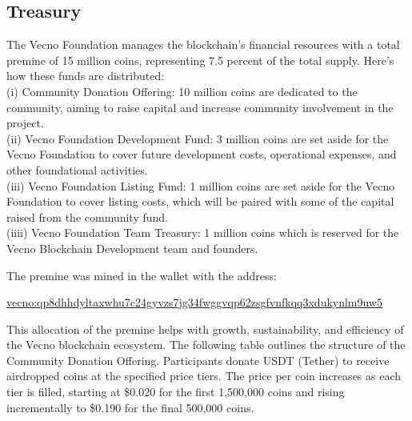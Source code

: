 \documentclass[a4paper,onecolumn,superscriptaddress,10pt]{compositionalityarticle}
\begin{document}
\subsection{Treasury}\label{sec2.3}

The Vecno Foundation manages the blockchain's financial resources with a total premine of 15 million coins, representing 7.5 percent of the total supply. Here's how these funds are distributed:\\ (i) Community Donation Offering: 10 million coins are dedicated to the community, aiming to raise capital and increase community involvement in the project.\\ (ii) Vecno Foundation Development Fund: 3 million coins are set aside for the Vecno Foundation to cover future development costs, operational expenses, and other foundational activities.\\ (iii) Vecno Foundation Listing Fund: 1 million coins are set aside for the Vecno Foundation to cover listing costs, which will be paired with some of the capital raised from the community fund.\\ (iiii) Vecno Foundation Team Treasury: 1 million coins which is reserved for the Vecno Blockchain Development team and founders.

\vspace{0.3cm}

\begin{center}\label{fig:premine}
\end{center}
\vspace{0.3cm}

The premine was mined in the wallet with the address:

\vspace{0.3cm}

\href{https://vecnoscan.org/addresses/vecno:qp8dhhdyltaxwhu7c24gyvzs7jg34fwggvqp62zsgfvnfkqq3xdukynlm9uw5}{vecno:qp8dhhdyltaxwhu7c24gyvzs7jg34fwggvqp62zsgfvnfkqq3xdukynlm9uw5}


\vspace{0.3cm}

This allocation of the premine helps with growth, sustainability, and efficiency of the Vecno blockchain ecosystem. The following table outlines the structure of the Community Donation Offering. Participants donate USDT (Tether) to receive airdropped coins at the specified price tiers. The price per coin increases as each tier is filled, starting at \$0.020 for the first 1,500,000 coins and rising incrementally to \$0.190 for the final 500,000 coins.
\end{document}
